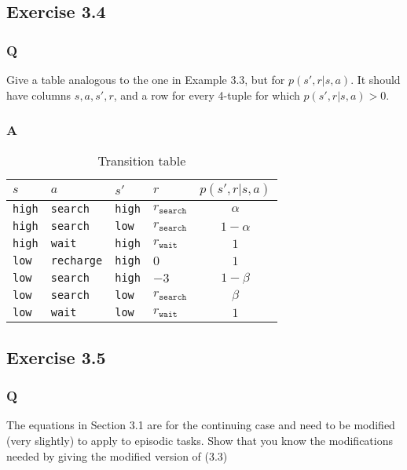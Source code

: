 \subsection{Exercise 3.4}
\subsubsection*{Q}
Give a table analogous to the one in Example 3.3, but for $p(s', r| s, a)$. It should have columns $s, a, s', r$, and a row for every 4-tuple for which $p(s', r | s, a) > 0$.

\subsubsection*{A}
\begin{table}[h!]
\centering
\begin{tabular}{ll|ll|c}
    $s$ & $a$ & $s'$ & $r$ & $p(s', r | s, a)$ \\
    \hline
     \texttt{high}& \texttt{search}&  \texttt{high}&  $r_{\texttt{search}}$& $\alpha$  \\
     \texttt{high}& \texttt{search}&  \texttt{low}&   $r_{\texttt{search}}$& $1 - \alpha$ \\
     \texttt{high}& \texttt{wait}&  \texttt{high}&   $r_{\texttt{wait}}$&  $1$ \\
     \texttt{low}& \texttt{recharge}&   \texttt{high}&    $0$&   $1$\\
     \texttt{low}& \texttt{search}&  \texttt{high}&  $-3$& $1 - \beta$  \\
     \texttt{low}& \texttt{search}&  \texttt{low}&   $r_{\texttt{search}}$& $\beta $\\
     \texttt{low}& \texttt{wait}&  \texttt{low}&   $r_{\texttt{wait}}$&  $1$
\end{tabular}


\caption{Transition table}
\label{table:3.4}
\end{table}


\subsection{Exercise 3.5}
\subsubsection*{Q}
The equations in Section 3.1 are for the continuing case and need to be modified (very slightly) to apply to episodic tasks. Show that you know the modifications needed by giving the modified version of (3.3)

